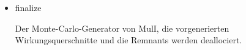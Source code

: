 \begin{itemize}
  Es werden einige interne Variablen zurückgesetzt, wie z.B. das "finished"-Flag. Außerdem werden die Remnants zurückgesetzt.
\item finalize

  Der Monte-Carlo-Generator von MulI, die vorgenerierten Wirkungsquerschnitte und die Remnants werden deallociert.
\end{itemize}
